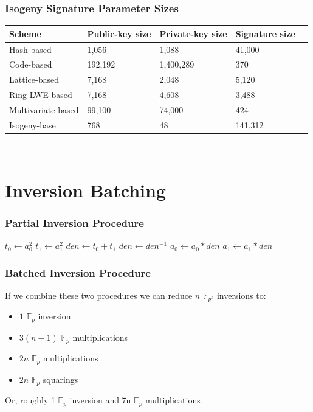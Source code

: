 \documentclass{beamer}
\begin{document}
\begin{frame}
\frametitle{Isogeny Signature Parameter Sizes}
\begin{tabular}{@{}lllll@{}}
	Scheme & Public-key size & Private-key size & Signature size\\
	\midrule
	Hash-based & 1,056 & 1,088 & 41,000\\
	Code-based & 192,192 & 1,400,289 & 370\\
	Lattice-based & 7,168 & 2,048 & 5,120\\
	Ring-LWE-based & 7,168 & 4,608 & 3,488\\
	Multivariate-based & 99,100 & 74,000 & 424\\
	\midrule
	Isogeny-base & 768 & 48 & 141,312\\
\end{tabular}\\
\end{frame}

\section{Inversion Batching}


\begin{frame}[fragile]
\frametitle{Partial Inversion Procedure}
\begin{algorithmic}[1]
	\State $t_0 \gets a_{0}^{2}$
	\State $t_1 \gets a_{1}^{2}$
	\State $den \gets t_0 + t_1$
	\State $den \gets den^{-1}$
	\State $a_{0} \gets a_{0} * den$
	\State $a_{1} \gets a_{1} * den$
\end{algorithmic}
\end{frame}

\begin{frame}[fragile]
\frametitle{Batched Inversion Procedure}
If we combine these two procedures we can reduce $n$ $\mathbb{F}_{p^{2}}$ inversions to:
\begin{itemize}
\item $1$ $\mathbb{F}_{p}$ inversion
\item $3(n-1)$ $\mathbb{F}_{p}$ multiplications
\item $2n$ $\mathbb{F}_{p}$ multiplications
\item $2n$ $\mathbb{F}_{p}$ squarings
\end{itemize}
Or, roughly 1 $\mathbb{F}_{p}$ inversion and 7n $\mathbb{F}_{p}$ multiplications
\end{frame}
\end{document}
